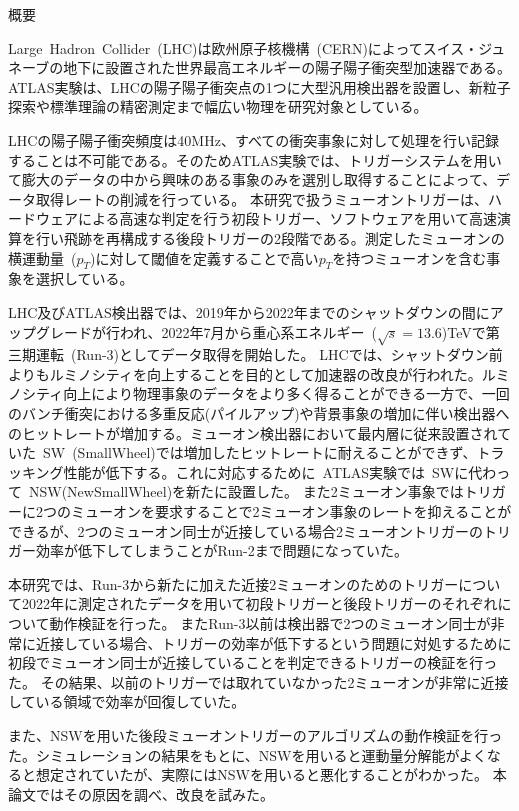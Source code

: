 \begin{center}
  \begin{huge}
    概要
  \end{huge}
\end{center}

\vspace{10pt}

Large~Hadron~Collider~(LHC)は欧州原子核機構~(CERN)によってスイス・ジュネーブの地下に設置された世界最高エネルギーの陽子陽子衝突型加速器である。ATLAS実験は、LHCの陽子陽子衝突点の1つに大型汎用検出器を設置し、新粒子探索や標準理論の精密測定まで幅広い物理を研究対象としている。

LHCの陽子陽子衝突頻度は40MHz、すべての衝突事象に対して処理を行い記録することは不可能である。そのためATLAS実験では、トリガーシステムを用いて膨大のデータの中から興味のある事象のみを選別し取得することによって、データ取得レートの削減を行っている。
本研究で扱うミューオントリガーは、ハードウェアによる高速な判定を行う初段トリガー、ソフトウェアを用いて高速演算を行い飛跡を再構成する後段トリガーの2段階である。測定したミューオンの横運動量~($p_{T}$)に対して閾値を定義することで高い$p_{T}$を持つミューオンを含む事象を選択している。

LHC及びATLAS検出器では、2019年から2022年までのシャットダウンの間にアップグレードが行われ、2022年7月から重心系エネルギー~($\sqrt{s}=13.6$)TeVで第三期運転~(Run-3)としてデータ取得を開始した。
LHCでは、シャットダウン前よりもルミノシティを向上することを目的として加速器の改良が行われた。ルミノシティ向上により物理事象のデータをより多く得ることができる一方で、一回のバンチ衝突における多重反応(パイルアップ)や背景事象の増加に伴い検出器へのヒットレートが増加する。ミューオン検出器において最内層に従来設置されていた~SW~(SmallWheel)では増加したヒットレートに耐えることができず、トラッキング性能が低下する。これに対応するために~ATLAS実験では~SWに代わって~NSW(NewSmallWheel)を新たに設置した。
また2ミューオン事象ではトリガーに2つのミューオンを要求することで2ミューオン事象のレートを抑えることができるが、2つのミューオン同士が近接している場合2ミューオントリガーのトリガー効率が低下してしまうことがRun-2まで問題になっていた。


本研究では、Run-3から新たに加えた近接2ミューオンのためのトリガーについて2022年に測定されたデータを用いて初段トリガーと後段トリガーのそれぞれについて動作検証を行った。
またRun-3以前は検出器で2つのミューオン同士が非常に近接している場合、トリガーの効率が低下するという問題に対処するために初段でミューオン同士が近接していることを判定できるトリガーの検証を行った。
その結果、以前のトリガーでは取れていなかった2ミューオンが非常に近接している領域で効率が回復していた。

また、NSWを用いた後段ミューオントリガーのアルゴリズムの動作検証を行った。シミュレーションの結果をもとに、NSWを用いると運動量分解能がよくなると想定されていたが、実際にはNSWを用いると悪化することがわかった。
本論文ではその原因を調べ、改良を試みた。
